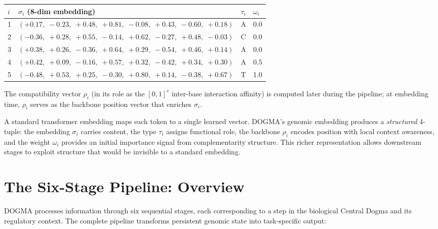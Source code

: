 \begin{center}
\renewcommand{\arraystretch}{1.15}
\footnotesize
\begin{tabularx}{\textwidth}{C{1cm} L{6cm} C{1.2cm} C{1.5cm}}
\toprule
\textbf{$i$} & \textbf{$\sigma_i$ (8-dim embedding)} & \textbf{$\tau_i$} & \textbf{$\omega_i$} \\
 & $(+0.17,\; -0.23,\; +0.48,\; +0.81,\; -0.08,\; +0.43,\; -0.60,\; +0.18)$ & A & 0.0 \\
2 & $(-0.36,\; +0.28,\; +0.55,\; -0.14,\; +0.62,\; -0.27,\; +0.48,\; -0.03)$ & C & 0.0 \\
3 & $(+0.38,\; +0.26,\; -0.36,\; +0.64,\; +0.29,\; -0.54,\; +0.46,\; +0.14)$ & A & 0.0 \\
4 & $(+0.42,\; +0.09,\; -0.16,\; +0.57,\; +0.32,\; -0.42,\; +0.34,\; +0.30)$ & A & 0.5 \\
5 & $(-0.48,\; +0.53,\; +0.25,\; -0.30,\; +0.80,\; +0.14,\; -0.38,\; +0.67)$ & T & 1.0 \\
\bottomrule
\end{tabularx}
\end{center}

The compatibility vector $\rho_i$ (in its role as the $[0,1]^c$ inter-base interaction affinity) is computed later during the pipeline; at embedding time, $\rho_i$ serves as the backbone position vector that enriches $\sigma_i$.

\begin{keyinsight}
A standard transformer embedding maps each token to a single learned vector. DOGMA's genomic embedding produces a \emph{structured} 4-tuple: the embedding $\sigma_i$ carries content, the type $\tau_i$ assigns functional role, the backbone $\rho_i$ encodes position with local context awareness, and the weight $\omega_i$ provides an initial importance signal from complementarity structure. This richer representation allows downstream stages to exploit structure that would be invisible to a standard embedding.
\end{keyinsight}

\section{The Six-Stage Pipeline: Overview}
\label{sec:six-stages}

DOGMA processes information through six sequential stages, each corresponding to a step in the biological Central Dogma and its regulatory context. The complete pipeline transforms persistent genomic state into task-specific output:

